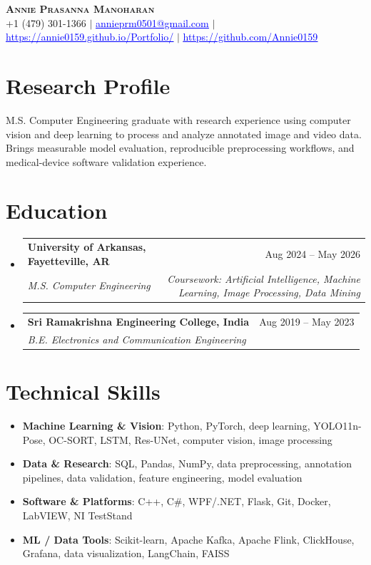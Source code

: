 \documentclass[letterpaper,10pt]{article}
\makeatletter
\newcommand{\resumeSubheading}[4]{\vspace{1pt}\item\begin{tabular*}{0.985\textwidth}[t]{l@{\extracolsep{\fill}}r}\textbf{#1} & #2 \\ \textit{\small#3} & \textit{\small#4} \\ \end{tabular*}\vspace{1pt}}
\newcommand{\resumeItem}[1]{\item\small{#1}}
\newcommand{\resumeSubHeadingListStart}{\begin{itemize}[leftmargin=0.0in,label={}]}
\newcommand{\resumeSubHeadingListEnd}{\end{itemize}\vspace{-2pt}}
\makeatother
\begin{document}
\begin{center}
  \textbf{\Large \scshape Annie Prasanna Manoharan}\\ \vspace{2pt}
  \small +1 (479) 301-1366 $|$ \href{mailto:annieprm0501@gmail.com}{\textcolor{blue}{\underline{annieprm0501@gmail.com}}} $|$ \href{https://annie0159.github.io/Portfolio/}{\textcolor{blue}{\underline{https://annie0159.github.io/Portfolio/}}} $|$ \href{https://github.com/Annie0159}{\textcolor{blue}{\underline{https://github.com/Annie0159}}}
\end{center}\vspace{-6pt}
\section{Research Profile}
\small{M.S. Computer Engineering graduate with research experience using computer vision and deep learning to process and analyze annotated image and video data. Brings measurable model evaluation, reproducible preprocessing workflows, and medical-device software validation experience.}
\vspace{-3pt}
\section{Education}
\resumeSubHeadingListStart
  \resumeSubheading{University of Arkansas, Fayetteville, AR}{Aug 2024 -- May 2026}{M.S. Computer Engineering}{Coursework: Artificial Intelligence, Machine Learning, Image Processing, Data Mining}
  \resumeSubheading{Sri Ramakrishna Engineering College, India}{Aug 2019 -- May 2023}{B.E. Electronics and Communication Engineering}{}
\resumeSubHeadingListEnd
\section{Technical Skills}
\begin{itemize}[leftmargin=0.0in,label={}]
\resumeItem{\textbf{Machine Learning \& Vision}: Python, PyTorch, deep learning, YOLO11n-Pose, OC-SORT, LSTM, Res-UNet, computer vision, image processing}
\resumeItem{\textbf{Data \& Research}: SQL, Pandas, NumPy, data preprocessing, annotation pipelines, data validation, feature engineering, model evaluation}
\resumeItem{\textbf{Software \& Platforms}: C++, C\#, WPF/.NET, Flask, Git, Docker, LabVIEW, NI TestStand}
\resumeItem{\textbf{ML / Data Tools}: Scikit-learn, Apache Kafka, Apache Flink, ClickHouse, Grafana, data visualization, LangChain, FAISS}
\end{itemize}\vspace{-5pt}
\end{document}
